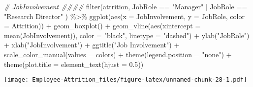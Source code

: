 \documentclass[
]{article}
\newenvironment{Shaded}{\begin{snugshade}}{\end{snugshade}}
\newcommand{\AttributeTok}[1]{\textcolor[rgb]{0.77,0.63,0.00}{#1}}
\newcommand{\CommentTok}[1]{\textcolor[rgb]{0.56,0.35,0.01}{\textit{#1}}}
\newcommand{\FloatTok}[1]{\textcolor[rgb]{0.00,0.00,0.81}{#1}}
\newcommand{\FunctionTok}[1]{\textcolor[rgb]{0.00,0.00,0.00}{#1}}
\newcommand{\NormalTok}[1]{#1}
\newcommand{\SpecialCharTok}[1]{\textcolor[rgb]{0.00,0.00,0.00}{#1}}
\newcommand{\StringTok}[1]{\textcolor[rgb]{0.31,0.60,0.02}{#1}}
\begin{document}
\begin{Shaded}
\begin{Highlighting}[]
\CommentTok{\# JobInvolvement \#\#\#\#}
\FunctionTok{filter}\NormalTok{(attrition, JobRole }\SpecialCharTok{==} \StringTok{"Manager"} \SpecialCharTok{|}\NormalTok{ JobRole }\SpecialCharTok{==} \StringTok{"Research Director"}\NormalTok{ ) }\SpecialCharTok{\%\textgreater{}\%}
  \FunctionTok{ggplot}\NormalTok{(}\FunctionTok{aes}\NormalTok{(}\AttributeTok{x =}\NormalTok{ JobInvolvement, }\AttributeTok{y =}\NormalTok{ JobRole, }\AttributeTok{color =}\NormalTok{ Attrition)) }\SpecialCharTok{+}
  \FunctionTok{geom\_boxplot}\NormalTok{() }\SpecialCharTok{+}
  \FunctionTok{geom\_vline}\NormalTok{(}\FunctionTok{aes}\NormalTok{(}\AttributeTok{xintercept =} \FunctionTok{mean}\NormalTok{(JobInvolvement)), }\AttributeTok{color =} \StringTok{"black"}\NormalTok{, }\AttributeTok{linetype =} \StringTok{"dashed"}\NormalTok{) }\SpecialCharTok{+}
  \FunctionTok{ylab}\NormalTok{(}\StringTok{"JobRole"}\NormalTok{) }\SpecialCharTok{+}
  \FunctionTok{xlab}\NormalTok{(}\StringTok{"JobInvolvement"}\NormalTok{) }\SpecialCharTok{+}
  \FunctionTok{ggtitle}\NormalTok{(}\StringTok{"Job Involvement"}\NormalTok{) }\SpecialCharTok{+}
  \FunctionTok{scale\_color\_manual}\NormalTok{(}\AttributeTok{values =}\NormalTok{ colors) }\SpecialCharTok{+}
  \FunctionTok{theme}\NormalTok{(}\AttributeTok{legend.position =} \StringTok{"none"}\NormalTok{) }\SpecialCharTok{+}
  \FunctionTok{theme}\NormalTok{(}\AttributeTok{plot.title =} \FunctionTok{element\_text}\NormalTok{(}\AttributeTok{hjust =} \FloatTok{0.5}\NormalTok{)) }
\end{Highlighting}
\end{Shaded}

\texttt{[image: Employee-Attrition\_files/figure-latex/unnamed-chunk-28-1.pdf]}
\end{document}
